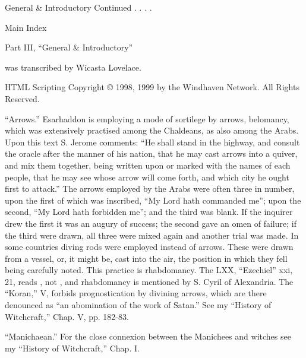                                          General & Introductory Continued . . . .

                                                        Main Index


                                                   Part III, “General & Introductory”

                                               was transcribed by Wicasta Lovelace.

                            HTML Scripting Copyright © 1998, 1999 by the Windhaven Network.
                                                  All Rights Reserved.



           “Arrows.” Esarhaddon is employing a mode of sortilege by arrows, belomancy, which
        was extensively practised among the Chaldeans, as also among the Arabs. Upon this text S.
        Jerome comments: “He shall stand in the highway, and consult the oracle after the manner
        of his nation, that he may cast arrows into a quiver, and mix them together, being written
        upon or marked with the names of each people, that he may see whose arrow will come
        forth, and which city he ought first to attack.” The arrows employed by the Arabs were often
        three in number, upon the first of which was inscribed, “My Lord hath commanded me”;
        upon the second, “My Lord hath forbidden me”; and the third was blank. If the inquirer
        drew the first it was an augury of success; the second gave an omen of failure; if the third
        were drawn, all three were mixed again and another trial was made. In some countries
        diving rods were employed instead of arrows. These were drawn from a vessel, or, it might
        be, cast into the air, the position in which they fell being carefully noted. This practice is
        rhabdomancy. The LXX, “Ezechiel” xxi, 21, reads                         , not                  ,
        and rhabdomancy is mentioned by S. Cyril of Alexandria. The “Koran,” V, forbids
        prognostication by divining arrows, which are there denounced as “an abomination of the
        work of Satan.” See my “History of Witchcraft,” Chap. V, pp. 182-83.



          “Manichaean.” For the close connexion between the Manichees and witches see my
        “History of Witchcraft,” Chap. I.




